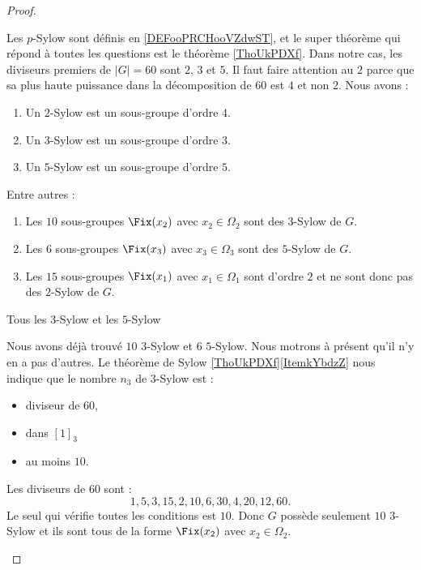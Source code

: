 \begin{proof}
\begin{subproof}
                Les \( p\)-Sylow sont définis en \ref{DEFooPRCHooVZdwST}, et le super théorème qui répond à toutes les questions est le théorème \ref{ThoUkPDXf}. Dans notre cas, les diviseurs premiers de \( | G |=60\) sont \( 2\), \( 3\) et \( 5\). Il faut faire attention au $2$ parce que sa plus haute puissance dans la décomposition de \( 60\) est \( 4\) et non \( 2\). Nous avons :
                \begin{enumerate}
                    \item
                        Un \( 2\)-Sylow est un sous-groupe d'ordre \( 4\).
                    \item
                        Un \( 3\)-Sylow est un sous-groupe d'ordre \( 3\). 
                    \item
                        Un \( 5\)-Sylow est un sous-groupe d'ordre \( 5\).
                \end{enumerate}
                Entre autres :
                \begin{enumerate}
                    \item
                        Les \( 10\) sous-groupes \( \Fix(x_2)\) avec \( x_2\in \Omega_2\) sont des \( 3\)-Sylow de \( G\).
                    \item
                        Les \( 6\) sous-groupes \( \Fix(x_3)\) avec \( x_3\in \Omega_3\) sont des \( 5\)-Sylow de \( G\).
                    \item
                        Les \( 15\) sous-groupes \( \Fix(x_1)\) avec \( x_1\in \Omega_1\) sont d'ordre $2$ et ne sont donc pas des \( 2\)-Sylow de \( G\).
                \end{enumerate}

            \item[Tous les \( 3\)-Sylow et les \( 5\)-Sylow]

                Nous avons déjà trouvé \( 10\) \( 3\)-Sylow et \( 6\) \( 5\)-Sylow. Nous motrons à présent qu'il n'y en a pas d'autres. Le théorème de Sylow \ref{ThoUkPDXf}\ref{ItemkYbdzZ} nous indique que le nombre \( n_3\) de \( 3\)-Sylow est :
                \begin{itemize}
                    \item diviseur de \( 60\),
                    \item dans \( [1]_3\)
                    \item au moins \( 10\).
                \end{itemize}
                Les diviseurs de \( 60\) sont :
                \begin{equation}
                    1,5,3,15,2,10,6,30,4,20,12,60.
                \end{equation}
                Le seul qui vérifie toutes les conditions est \( 10\). Donc \( G\) possède seulement \( 10\) \( 3\)-Sylow et ils sont tous de la forme \( \Fix(x_2)\) avec \( x_2\in \Omega_2\). 


\end{subproof}
\end{proof}
